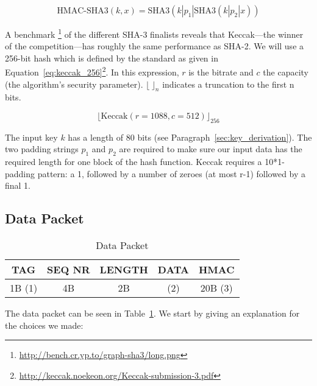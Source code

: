 \documentclass[a4paper]{article}
\begin{document}
\begin{equation} \label{eq:hmac_sha3}
    \text{HMAC-SHA3}(k, x) = \text{SHA3}(k | p_1 | \text{SHA3}(k | p_2 | x))
\end{equation}

A benchmark \footnote{\url{http://bench.cr.yp.to/graph-sha3/long.png}} of the different SHA-3 finalists reveals that Keccak---the winner of the competition---has roughly the same performance as SHA-2. We will use a 256-bit hash which is defined by the standard as given in Equation~\ref{eq:keccak_256}\footnote{\url{http://keccak.noekeon.org/Keccak-submission-3.pdf}}. In this expression, $r$ is the bitrate and $c$ the capacity (the algorithm's security parameter). ${\lfloor}{\ }{\rfloor}_n$ indicates a truncation to the first n bits.

\begin{equation} \label{eq:keccak_256}
    {\lfloor}\text{Keccak}(r = 1088, c = 512){\rfloor}_{256}
\end{equation}

The input key $k$ has a length of 80 bits (see Paragraph~\ref{sec:key_derivation}). The two padding strings $p_1$ and $p_2$ are required to make sure our input data has the required length for one block of the hash function. Keccak requires a 10*1-padding pattern: a 1, followed by a number of zeroes (at most r-1) followed by a final 1.

\subsection{Data Packet}

\begin{table}[H]
    \begin{center}
        \begin{tabular}{| c | c | c | c | c |}
            \hline
            TAG & SEQ NR & LENGTH & DATA & HMAC \\ \hline
            1B (1) & 4B & 2B & (2) & 20B (3) \\
            \hline
        \end{tabular}
    \end{center}
    
    \caption{Data Packet}
    \label{tab:data_packet}
\end{table}

The data packet can be seen in Table~\ref{tab:data_packet}. We start by giving an explanation for the choices we made:
\end{document}
